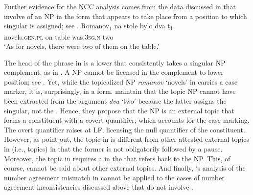 \documentclass[output=paper,modfonts,newtxmath,hidelinks]{langscibook}
\begin{document}
\section{\citet{Franks-House1982}}\label{18:s4}
Further evidence for the NCC analysis comes from the data discussed in \citet{Franks-House1982} that involve  of an NP in the   form that appears to take place from a position to which  singular is assigned; see .
\ea \label{18:ex27}
\gll Romanov$_1$  na  stole  bylo  dva         t\textsubscript{1}.\\
     novels.\textsc{gen.pl}  on  table  was.\textsc{3sg.n}  two\\\hfill\citep[157]{Franks-House1982}
\glt `As for novels, there were two of them on the table.'\\
\z
\ea \label{18:ex28}
	\z
\z 

\noindent The head of the  phrase in  is a lower  that consistently takes a  singular NP complement, as in . A   NP cannot be licensed in the complement to lower  position; see . Yet, while the topicalized NP \textit{romanov} ‘novels’ in  carries a  case marker, it is, surprisingly, in a  form. \citeauthor{Franks-House1982} maintain that the topic NP cannot have been extracted from the argument \textit{dva} ‘two’ because the latter assigns the  singular, not the  . Hence, they propose that the  NP is an external topic that forms a constituent with a covert quantifier, which accounts for the  case marking. The overt quantifier raises at LF, licensing the null quantifier of the  constituent. However, as \citeauthor{Franks-House1982} point out, the  topic in  is different from other attested external topics in  (i.e.,  topics) in that the former is not obligatorily followed by a pause. Moreover, the  topic in  requires a  in the  that refers back to the  NP. This, of course, cannot be said about other external topics. And finally, \citeauthor{Franks-House1982}’s analysis of the number agreement mismatch in  cannot be applied to the cases of number agreement inconsistencies discussed above that do not involve . 
\end{document}
